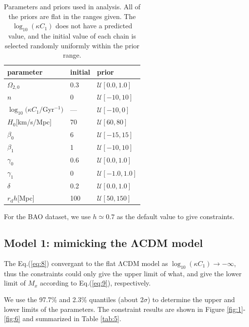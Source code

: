 \documentclass[twocolumn]{aastex631}
\begin{document}
   \begin{table}[htbp]
      \centering
      \begin{tabular}{lll}
         \hline\hline
         parameter & initial & prior \\
         \hline
         $\Omega_{2,0}$ & 0.3 & $\mathcal{U}[0.0,1.0]$ \\
         $n$ & 0 & $\mathcal{U}[-10,10]$ \\
         $\log_{10}(\kappa C_1/$Gyr${}^{-1})$ & --- & $\mathcal{U}[-10,0]$ \\
         $H_0$[km/s/Mpc] & 70 & $\mathcal{U}[60,80]$ \\
         \hline
         $\beta_0$ & 6 & $\mathcal{U}[-15,15]$ \\
         $\beta_1$ & 1 & $\mathcal{U}[-10,10]$ \\
         $\gamma_0$ & 0.6 & $\mathcal{U}[0.0,1.0]$ \\
         $\gamma_1$ & 0 & $\mathcal{U}[-1.0,1.0]$ \\         
         $\delta$ & 0.2 & $\mathcal{U}[0.0,1.0]$ \\
         \hline
         $r_{\text{d}}h$[Mpc] & 100 & $\mathcal{U}[50,150]$ \\
         \hline
      \end{tabular}
      \caption{Parameters and priors used in analysis. 
      All of the priors are flat in the ranges given. 
      The $\log_{10}(\kappa C_1)$ does not have a predicted value, 
      and the initial value of each chain is selected randomly uniformly
      within the prior range.}
      \label{tab:4}
   \end{table}

   For the BAO dataset, we use $h \simeq 0.7$ as the default value to give constraints.

\subsection{Model 1: mimicking the ΛCDM model}

   The Eq.(\ref{eq:8}) convergant to the flat ΛCDM model as
   $\log_{10}(\kappa C_1)\to-\infty$, thus the constraints
   could only give the upper limit of what, and give the lower limit
   of $M_x$ according to Eq.(\ref{eq:9}), respectively.

   We use the 97.7\% and 2.3\% quantiles (about $2\sigma$) to determine the upper and lower
   limits of the parameters. The  constraint results are shown in 
   Figure \ref{fig:1}-\ref{fig:6} and summarized in Table \ref{tab:5}.
\end{document}
